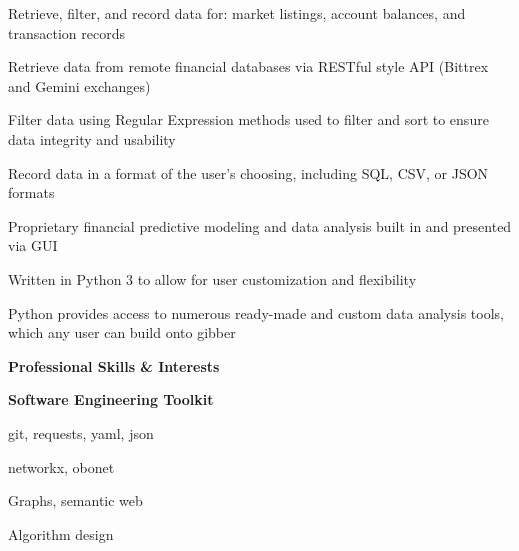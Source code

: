 \documentclass[letterpaper,final]{memoir}
\newcommand{\LargeSep}{\vspace{1.3em}}
\newcommand{\Sep}{\vspace{1.0em}}
\newcommand{\SmallSep}{\vspace{0.4em}}
\newcommand{\CVSection}[1]
	{\LARGE\textbf{#1}\par
	\SmallSep\normalsize}
\newcommand{\CVItem}[1]
	{\textbf{\color{Blue} #1}}
\begin{document}
\begin{compactitem}[\color{Blue}$\circ$]

    \SmallSep
    
    \item Retrieve, filter, and record data for: market listings, account balances, and transaction records
    
    \item Retrieve data from remote financial databases via RESTful style API (Bittrex and Gemini exchanges)
    
    \item Filter data using Regular Expression methods used to filter and sort to ensure data integrity and usability
    
    \item Record data in a format of the user's choosing, including SQL, CSV, or JSON formats
    
    \item Proprietary financial predictive modeling and data analysis built in and presented via GUI
    
    \item Written in Python 3 to allow for user customization and flexibility
    
    \item Python provides access to numerous ready-made and custom data analysis tools, which any user can build onto gibber

\end{compactitem}
\LargeSep


\notoserif \CVSection{Professional Skills \& Interests}
\normalfont

\Sep
\CVItem{Software Engineering Toolkit}
\SmallSep

\begin{multicols}{4}

    \begin{compactitem}[\color{Blue}$\circ$]
		
		\item git, requests, yaml, json
        \SmallSep
        
        \item networkx, obonet
        \SmallSep
        
        \item Graphs, semantic web
        \SmallSep
        
        \item Algorithm design
        
    
	\end{compactitem}

\end{multicols}
\end{document}
